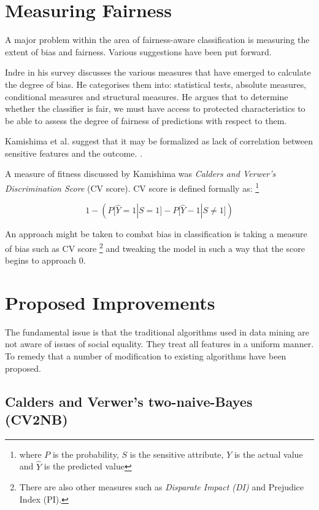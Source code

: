 \documentclass[a4paper, 12pt, notitlepage]{article}
\begin{document}
\section*{Measuring Fairness}

A major problem within the area of fairness-aware classification is measuring the extent of bias and fairness. \cite[p.281]{calders2010} Various suggestions have been put forward.

Indre in his survey discusses the various measures that have emerged to calculate the degree of bias. He categorises them into: statistical tests, absolute measures, conditional measures and structural measures. He argues that to determine whether the classifier is fair, we must have access to protected characteristics to be able to assess the degree of fairness of predictions with respect to them. \cite[p.~8]{indre2015}

Kamishima et al. suggest that it may be formalized as lack of correlation between sensitive features and the outcome. \cite[p.~259]{kamishima2018}.

A measure of fitness discussed by Kamishima was \emph{Calders and Verwer's Discrimination Score} (CV score). CV score is defined formally as: \footnote{where $P$ is the probability, $S$ is the sensitive attribute, $Y$ is the actual value and $\hat{Y}$ is the predicted value}

\[
  1 - (P\big[ \hat{Y} = 1 | S = 1\big] - P \big[ \hat{Y} - 1 | S \neq 1 \big])
\] 

An approach might be taken to combat bias in classification is taking a measure of bias such as CV score \footnote{There are also other measures such as \emph{Disparate Impact (DI)} and Prejudice Index (PI).} and tweaking the model in such a way that the score begins to approach 0. 

\section*{Proposed Improvements}

The fundamental issue is that the traditional algorithms used in data mining are not aware of issues of social equality. They treat all features in a uniform manner. To remedy that a number of modification to existing algorithms have been proposed.

\subsection*{Calders and Verwer's two-naive-Bayes (CV2NB)}
\end{document}

